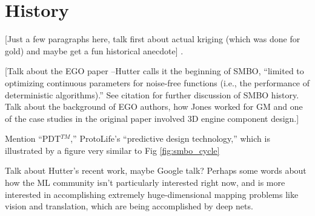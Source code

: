 \section{History}


[Just a few paragraphs here, talk first about actual kriging (which was done for gold) and maybe get a fun historical anecdote] \cite{cressie_kriging_1990}.

[Talk about the EGO paper \cite{jones_efficient_1998}--Hutter calls it the beginning of SMBO, ``limited to optimizing continuous parameters for noise-free functions (i.e., the performance of deterministic algorithms).'' \cite{hutter_sequential_2011} See citation for further discussion of SMBO history. Talk about the background of EGO authors, how Jones worked for GM and one of the case studies in the original paper involved 3D engine component design.]

Mention ``PDT$^{TM}$,'' ProtoLife's ``predictive design technology,'' which is illustrated by a figure very similar to Fig \ref{fig:smbo_cycle} \cite{protolife_pdt_2013}

Talk about Hutter's recent work, maybe Google talk? Perhaps some words about how the ML community isn't particularly interested right now, and is more interested in accomplishing extremely huge-dimensional mapping problems like vision and translation, which are being accomplished by deep nets.




